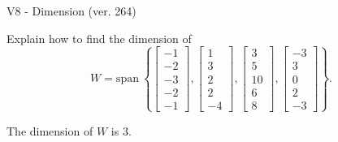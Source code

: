 \begin{exercise}
  \begin{exerciseTitle}V8 - Dimension (ver. 264)\end{exerciseTitle}
  \begin{exerciseStatement}
    Explain how to find the dimension of 
\[W=\mathrm{span}\ \left\{\left[\begin{array}{r}
-1 \\
-2 \\
-3 \\
-2 \\
-1
\end{array}\right] , \left[\begin{array}{r}
1 \\
3 \\
2 \\
2 \\
-4
\end{array}\right] , \left[\begin{array}{r}
3 \\
5 \\
10 \\
6 \\
8
\end{array}\right] , \left[\begin{array}{r}
-3 \\
3 \\
0 \\
2 \\
-3
\end{array}\right]\right\}.\]



  \end{exerciseStatement}
  \begin{exerciseAnswer}
   The dimension of \(W\) is  \(3\).
  


  \end{exerciseAnswer}
\end{exercise}
